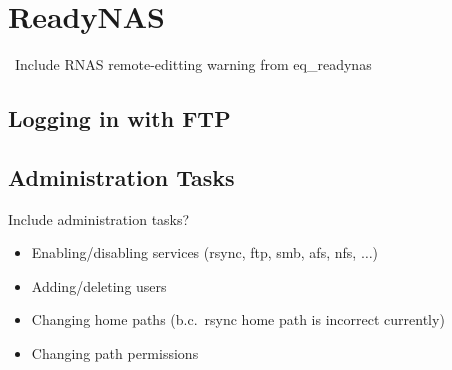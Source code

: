 
\section{ReadyNAS}
\label{sec:op_readynas}

\FIXME\ Include RNAS remote-editting warning from eq\_readynas

\subsection{Logging in with FTP}
\label{sec:op_readynas:ftp}

\subsection{Administration Tasks \FIXME}

Include administration tasks?
\begin{itemize}
\item Enabling/disabling services (rsync, ftp, smb, afs, nfs, $\ldots$)
\item Adding/deleting users
\item Changing home paths (b.c.\ rsync home path is incorrect currently)
\item Changing path permissions
\end{itemize}


